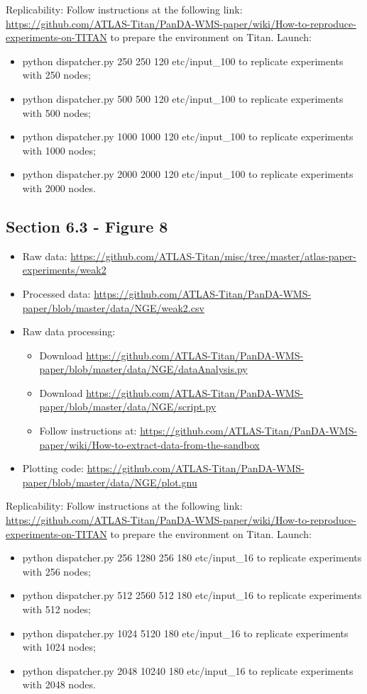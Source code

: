 Replicability: Follow instructions at the following link: \url{https://github.com/ATLAS-Titan/PanDA-WMS-paper/wiki/How-to-reproduce-experiments-on-TITAN} to prepare the environment on Titan.
Launch:
\begin{itemize}
\item python dispatcher.py 250 250 120 etc/input\_100 to replicate experiments with 250 nodes;
\item python dispatcher.py 500 500 120 etc/input\_100 to replicate experiments with 500 nodes;
\item python dispatcher.py 1000 1000 120 etc/input\_100 to replicate experiments with 1000 nodes;
\item python dispatcher.py 2000 2000 120 etc/input\_100 to replicate experiments with 2000 nodes.
\end{itemize}



\subsection{Section 6.3 - Figure 8}
\label{apndx:fig10}
\begin{itemize}
    \item Raw data: \url{https://github.com/ATLAS-Titan/misc/tree/master/atlas-paper-experiments/weak2}
     \item Processed data: \url{ https://github.com/ATLAS-Titan/PanDA-WMS-paper/blob/master/data/NGE/weak2.csv} 
    \item Raw data processing: 
    	\begin{itemize}
    		\item Download \url{https://github.com/ATLAS-Titan/PanDA-WMS-paper/blob/master/data/NGE/dataAnalysis.py}
    		\item Download \url{https://github.com/ATLAS-Titan/PanDA-WMS-paper/blob/master/data/NGE/script.py}
    		\item Follow instructions at: \url{https://github.com/ATLAS-Titan/PanDA-WMS-paper/wiki/How-to-extract-data-from-the-sandbox}
   	\end{itemize}
    \item Plotting code: \url{https://github.com/ATLAS-Titan/PanDA-WMS-paper/blob/master/data/NGE/plot.gnu}
\end{itemize}

Replicability: Follow instructions at the following link: \url{https://github.com/ATLAS-Titan/PanDA-WMS-paper/wiki/How-to-reproduce-experiments-on-TITAN} to prepare the environment on Titan.
Launch:
\begin{itemize}
\item python dispatcher.py 256 1280 256 180 etc/input\_16 to replicate experiments with 256 nodes;
\item python dispatcher.py 512 2560 512 180 etc/input\_16 to replicate experiments with 512 nodes;
\item python dispatcher.py 1024 5120 180 etc/input\_16 to replicate experiments with 1024 nodes;
\item python dispatcher.py 2048 10240 180 etc/input\_16 to replicate experiments with 2048 nodes.
\end{itemize}


